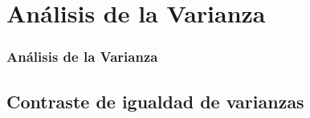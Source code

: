
\section{Análisis de la Varianza}

\begin{frame}
  \frametitle{Análisis de la Varianza}
  \tableofcontents[sectionstyle=show/hide,hideothersubsections]
\end{frame}


\subsection{Contraste de igualdad de varianzas}
\begin{frame}
  \frametitle{}

\end{frame}

